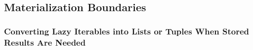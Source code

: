\subsection{Materialization Boundaries}
\subsubsection{Converting Lazy Iterables into Lists or Tuples When Stored Results Are Needed}
